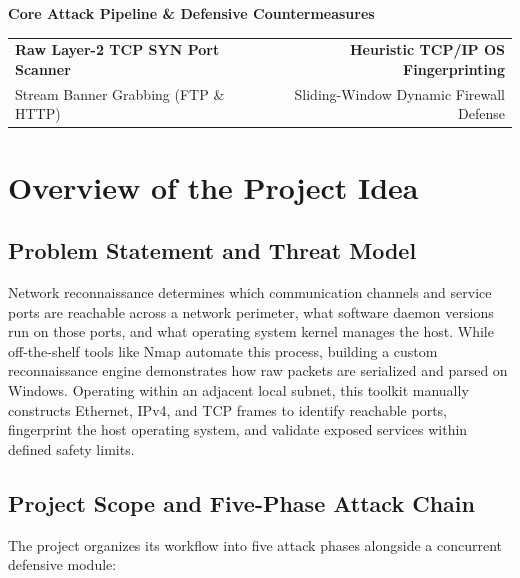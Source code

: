 \documentclass[11pt,a4paper]{article}
\begin{document}
\noindent
\begin{tcolorbox}[
    colback=lightbg,
    colframe=secondary!55,
    arc=3pt,
    boxrule=1.1pt,
    left=20pt, right=20pt, top=14pt, bottom=14pt
]
    \centering
    {\bfseries\Large\color{secondary} Core Attack Pipeline \& Defensive Countermeasures}\\[12pt]
    \normalsize
    \renewcommand{\arraystretch}{1.4}
    \begin{tabular*}{\linewidth}{@{\extracolsep{\fill}}lr@{}}
        \textbf{Raw Layer-2 TCP SYN Port Scanner} & \textbf{Heuristic TCP/IP OS Fingerprinting} \\[4pt]
        Stream Banner Grabbing (FTP \& HTTP) & Sliding-Window Dynamic Firewall Defense \\
    \end{tabular*}
\end{tcolorbox}

\vspace*{1.0cm}

\clearpage

\section{Overview of the Project Idea}

\subsection{Problem Statement and Threat Model}
Network reconnaissance determines which communication channels and service ports are reachable across a network perimeter, what software daemon versions run on those ports, and what operating system kernel manages the host. While off-the-shelf tools like Nmap automate this process, building a custom reconnaissance engine demonstrates how raw packets are serialized and parsed on Windows. Operating within an adjacent local subnet, this toolkit manually constructs Ethernet, IPv4, and TCP frames to identify reachable ports, fingerprint the host operating system, and validate exposed services within defined safety limits.

\subsection{Project Scope and Five-Phase Attack Chain}
The project organizes its workflow into five attack phases alongside a concurrent defensive module:
\end{document}
